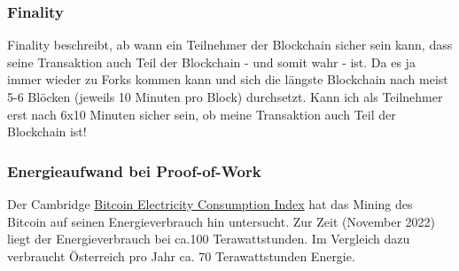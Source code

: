 \documentclass[10pt,a4paper,titlepage]{article}
\begin{document}
\subsubsection{Finality}
Finality beschreibt, ab wann ein Teilnehmer der Blockchain sicher sein kann, dass seine Transaktion auch Teil der Blockchain - und somit wahr - ist. Da es ja immer wieder zu Forks kommen kann und sich die längste Blockchain nach meist 5-6 Blöcken (jeweils 10 Minuten pro Block) durchsetzt. Kann ich als Teilnehmer erst nach 6x10 Minuten sicher sein, ob meine Transaktion auch Teil der Blockchain ist!
\subsubsection{Energieaufwand bei Proof-of-Work}
Der Cambridge \href{https://ccaf.io/cbeci/index}{\color{blue}Bitcoin Electricity Consumption Index} hat das Mining des Bitcoin auf seinen Energieverbrauch hin untersucht. Zur Zeit (November 2022) liegt der Energieverbrauch bei ca.100 Terawattstunden. Im Vergleich dazu verbraucht Österreich pro Jahr ca. 70 Terawattstunden Energie.
\end{document}
